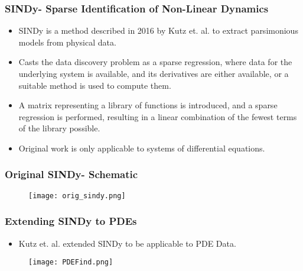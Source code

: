 \documentclass[]{beamer}
\begin{document}
\begin{frame}
    \frametitle{SINDy- Sparse Identification of Non-Linear Dynamics}
    \begin{itemize}
        \item SINDy is a method described in 2016 by Kutz et. al. to extract parsimonious models from physical data.
        \item Casts the data discovery problem as a sparse regression, where data for the underlying system is available, and its derivatives are either available, or a suitable method is used to compute them.
        \item A matrix representing a library of functions is introduced, and a sparse regression is performed, resulting in a linear combination of the fewest terms of the library possible.
        \item Original work is only applicable to systems of differential equations.
    \end{itemize}
\end{frame}

\begin{frame}
    \frametitle{Original SINDy- Schematic}
     \begin{figure}
        \centering
        \texttt{[image: orig\_sindy.png]}
    \end{figure}
\end{frame}

\begin{frame}
    \frametitle{Extending SINDy to PDEs}
    \begin{itemize}
        \item Kutz et. al. extended SINDy to be applicable to PDE Data.
     \end{itemize}
          \begin{figure}
        \centering
        \texttt{[image: PDEFind.png]}
    \end{figure}
\end{frame}
\end{document}
